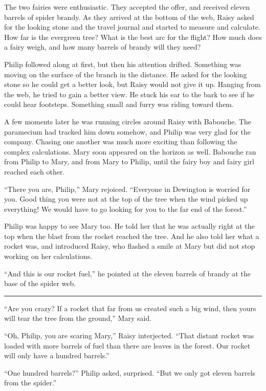 \documentclass[10pt]{memoir}
\renewcommand{\pfbreakdisplay}{\bigskip \ding{166} \bigskip}
\newcommand{\secbreak}{\fancybreak{\pfbreakdisplay}}
\begin{document}
The two fairies were enthusiastic. They accepted the offer, and received eleven
barrels of spider brandy. As they arrived at the bottom of the web, Raisy asked
for the looking stone and the travel journal and started to measure and
calculate. How far is the evergreen tree? What is the best arc for the flight?
How much does a fairy weigh, and how many barrels of brandy will they need?

Philip followed along at first, but then his attention drifted. Something was
moving on the surface of the branch in the distance. He asked for the looking
stone so he could get a better look, but Raisy would not give it up. Hanging
from the web, he tried to gain a better view. He stuck his ear to the bark to
see if he could hear footsteps. Something small and furry was riding toward
them.

A few moments later he was running circles around Raisy with Babouche. The
paramecium had tracked him down somehow, and Philip was very glad for the
company. Chasing one another was much more exciting than following the complex
calculations. Mary soon appeared on the horizon as well. Babouche ran from
Philip to Mary, and from Mary to Philip, until the fairy boy and fairy girl
reached each other.

``There you are, Philip,'' Mary rejoiced. ``Everyone in Dewington is worried
for you. Good thing you were not at the top of the tree when the wind picked up
everything! We would have to go looking for you to the far end of the forest.''

Philip was happy to see Mary too. He told her that he was actually right at the
top when the blast from the rocket reached the tree. And he also told her what
a rocket was, and introduced Raisy, who flashed a smile at Mary but did not
stop working on her calculations.

``And this is our rocket fuel,'' he pointed at the eleven barrels of brandy at
the base of the spider web.

\secbreak

``Are you crazy? If a rocket that far from us created such a big wind, then
yours will tear the tree from the ground,'' Mary said.

``Oh, Philip, you are scaring Mary,'' Raisy interjected. ``That distant rocket
was loaded with more barrels of fuel than there are leaves in the forest. Our
rocket will only have a hundred barrels.''

``One hundred barrels?'' Philip asked, surprised. ``But we only got eleven
barrels from the spider.''
\end{document}
